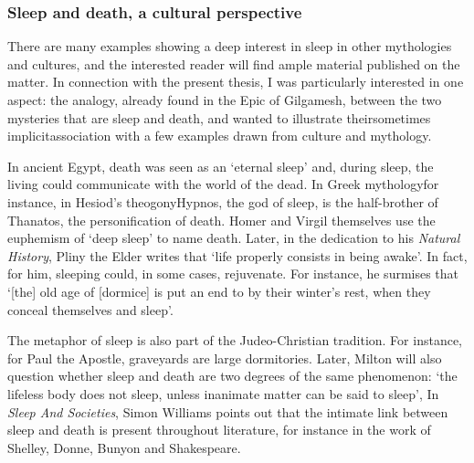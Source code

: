 \subsubsection{Sleep and death, a cultural perspective}

There are many examples showing a deep interest in sleep in other mythologies and cultures,
and the interested reader will find ample material published on the matter\cite{hohne_mythology_2009,monge_sommeil_2005}. 
In connection with the present thesis, I was particularly interested in one aspect: the analogy, already found in the Epic of Gilgamesh, between the two mysteries that are sleep and death, and wanted to illustrate their\emd{}sometimes implicit\emd{}association with a few examples drawn from culture and mythology.

In ancient Egypt, death was seen as an `eternal sleep' and, during sleep, the living could communicate with the world of the dead\cite{asaad_sleep_2015}.
In Greek mythology\emd{}for instance, in Hesiod's theogony\emd{}Hypnos, the god of sleep, is the half-brother of Thanatos, the personification of death\cite{hesiod_theogony_2006}.
Homer and Virgil themselves use the euphemism of `deep sleep' to name death\cite{ragon_espace_2012}.
Later, in the dedication to his \emph{Natural History}, Pliny the Elder writes that `life properly consists in being awake'\cite[book~I]{pliny_the_elder_natural_1855}.
In fact, for him, sleeping could, in some cases, rejuvenate.
For instance, he surmises that `[the] old age of [dormice] is put an end to by their winter's rest, when they conceal themselves and sleep'\cite[book~VIII, chap.~82]{pliny_the_elder_natural_1855}.

The metaphor of sleep is also part of the Judeo-Christian tradition. 
For instance, for Paul the Apostle, graveyards are large dormitories\cite{ragon_espace_2012}.
Later, Milton will also question whether sleep and death are two degrees of the same phenomenon: `the lifeless body does not sleep, unless inanimate matter can be said to sleep'\cite[p.~285]{milton_treatise_1825},
In \emph{Sleep And Societies}, Simon Williams points out that the intimate link between sleep and death is present throughout literature, for instance in the work of Shelley, Donne, Bunyon and Shakespeare\cite[p.~150]{williams_sleep_2013}.



